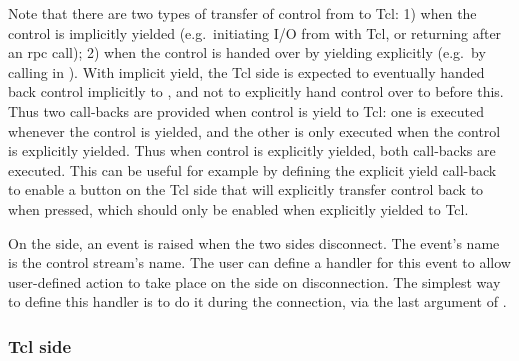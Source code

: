Note that there are two types of transfer of control from {\eclipse} to
Tcl: 1) when the control is implicitly yielded (e.g.\ initiating I/O
from {\eclipse} with Tcl, or returning after an rpc call); 2) when the
control is handed over by yielding explicitly (e.g.\ by calling
 in {\eclipse}). With implicit yield, the Tcl side is
expected to eventually handed back control implicitly to {\eclipse}, and
not to explicitly hand control over to {\eclipse} before this. Thus two
call-backs are provided when control is yield to Tcl: one is executed
whenever the control is yielded, and the other is only executed when the
control is explicitly yielded. Thus when control is explicitly yielded,
both call-backs are executed. This can be useful for example by defining
the explicit yield call-back to enable a button on the Tcl side that will
explicitly transfer control back to {\eclipse} when pressed, which should
only be enabled when {\eclipse} explicitly yielded to Tcl.

On the {\eclipse} side, an event is raised when the two sides
disconnect. The event's name is the control stream's name. The user can
define a handler for this event to allow user-defined action to take place
on the {\eclipse} side on disconnection. The simplest way to define this
handler is to do it during the connection, via the last argument of .

\subsubsection{Tcl side}

